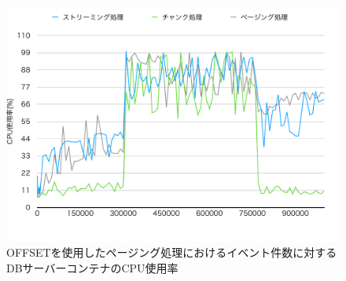 \documentclass[../../../../../main]{subfiles}
\begin{document}
    \begin{figure}[H]
        \centering
        \includegraphics[width=12cm]{graph}
        \caption{OFFSETを使用したページング処理におけるイベント件数に対するDBサーバーコンテナのCPU使用率}
        \label{fig:each-way-db-cpu-app_1_1024-db_1_1024}
    \end{figure}
\end{document}
